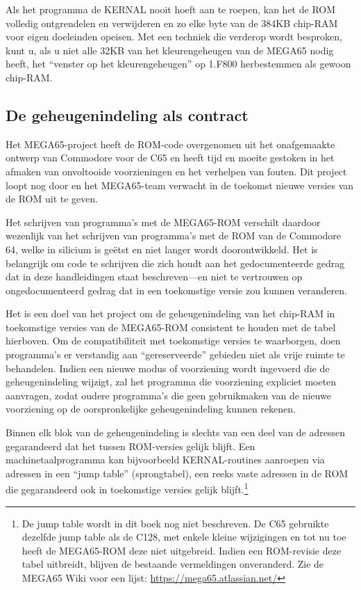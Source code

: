 Als het programma de KERNAL nooit hoeft aan te roepen, kan het de ROM volledig ontgrendelen en verwijderen en zo elke byte van de 384KB chip-RAM voor eigen doeleinden opeisen. Met een techniek die verderop wordt besproken, kunt u, als u niet alle 32KB van het kleurengeheugen van de MEGA65 nodig heeft, het ``venster op het kleurengeheugen'' op 1.F800 herbestemmen als gewoon chip-RAM.

\subsection{De geheugenindeling als contract}

Het MEGA65-project heeft de ROM-code overgenomen uit het onafgemaakte ontwerp van Commodore voor de C65 en heeft tijd en moeite gestoken in het afmaken van onvoltooide voorzieningen en het verhelpen van fouten. Dit project loopt nog door en het MEGA65-team verwacht in de toekomst nieuwe versies van de ROM uit te geven.

Het schrijven van programma's met de MEGA65-ROM verschilt daardoor wezenlijk van het schrijven van programma's met de ROM van de Commodore 64, welke in silicium is geëtst en niet langer wordt doorontwikkeld. Het is belangrijk om code te schrijven die zich houdt aan het gedocumenteerde gedrag dat in deze handleidingen staat beschreven---en niet te vertrouwen op ongedocumenteerd gedrag dat in een toekomstige versie zou kunnen veranderen.

Het is een doel van het project om de geheugenindeling van het chip-RAM in toekomstige versies van de MEGA65-ROM consistent te houden met de tabel hierboven. Om de compatibiliteit met toekomstige versies te waarborgen, doen programma's er verstandig aan ``gereserveerde'' gebieden niet als vrije ruimte te behandelen. Indien een nieuwe modus of voorziening wordt ingevoerd die de geheugenindeling wijzigt, zal het programma die voorziening expliciet moeten aanvragen, zodat oudere programma's die geen gebruikmaken van de nieuwe voorziening op de oorspronkelijke geheugenindeling kunnen rekenen.

Binnen elk blok van de geheugenindeling is slechts van een deel van de adressen gegarandeerd dat het tussen ROM-versies gelijk blijft. Een machinetaalprogramma kan bijvoorbeeld KERNAL-routines aanroepen via adressen in een ``jump table'' (sprongtabel), een reeks vaste adressen in de ROM die gegarandeerd ook in toekomstige versies gelijk blijft.\footnote{De jump table wordt in dit boek nog niet beschreven. De C65 gebruikte dezelfde jump table als de C128, met enkele kleine wijzigingen en tot nu toe heeft de MEGA65-ROM deze niet uitgebreid. Indien een ROM-revisie deze tabel uitbreidt, blijven de bestaande vermeldingen onveranderd. Zie de MEGA65 Wiki voor een lijst: \url{https://mega65.atlassian.net/}}

